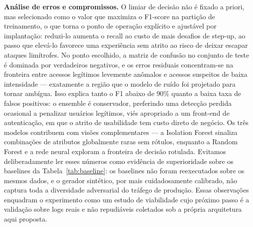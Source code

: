 \documentclass[conference]{IEEEtran}
\begin{document}
\textbf{Análise de erros e compromissos.} O limiar de decisão não é
fixado a priori, mas selecionado como o valor que maximiza o F1-score na
partição de treinamento, o que torna o ponto de operação explícito e
ajustável por implantação: reduzi-lo aumenta o recall ao custo de mais
desafios de step-up, ao passo que elevá-lo favorece uma experiência sem
atrito ao risco de deixar escapar ataques limítrofes. No ponto
escolhido, a matriz de confusão no conjunto de teste é dominada por
verdadeiros negativos, e os erros residuais concentram-se na fronteira
entre acessos legítimos levemente anômalos e acessos suspeitos de baixa
intensidade --- exatamente a região que o modelo de ruído foi projetado
para tornar ambígua. Isso explica tanto o F1 abaixo de 90\% quanto a
baixa taxa de falsos positivos: o ensemble é conservador, preferindo uma
detecção perdida ocasional a penalizar usuários legítimos, viés
apropriado a um front-end de autenticação, em que o atrito de
usabilidade tem custo direto de negócio. Os três modelos contribuem com
visões complementares --- a Isolation Forest sinaliza combinações de
atributos globalmente raras sem rótulos, enquanto a Random Forest e a
rede neural exploram a fronteira de decisão rotulada. Evitamos deliberadamente ler esses números como
evidência de superioridade sobre os baselines da
Tabela~\ref{tab:baseline}: os baselines não foram reexecutados sobre os
mesmos dados, e o gerador sintético, por mais cuidadosamente calibrado,
não captura toda a diversidade adversarial do tráfego de produção. Essas
observações enquadram o experimento como um estudo de viabilidade cujo
próximo passo é a validação sobre logs reais e não repudiáveis coletados
sob a própria arquitetura aqui proposta.
\end{document}
